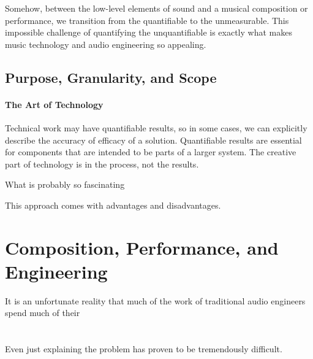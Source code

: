 Somehow, between the low-level elements of sound  and a musical
composition or performance, we transition from the quantifiable to the
unmeasurable. This impossible challenge of quantifying the
unquantifiable is exactly what makes music technology and audio
engineering so appealing.



\subsection{Purpose, Granularity, and Scope}
\label{sec:purp-gran-scope}



\paragraph{The Art of Technology} Technical work may have quantifiable
results, so in some cases, we can explicitly describe the accuracy of
efficacy of a solution. Quantifiable results are essential for
components that are intended to be parts of a larger system. The
creative part of technology is in the process, not the results.

What is probably so fascinating 

This approach comes with advantages and
disadvantages. 








\section{Composition, Performance, and Engineering}
It is an unfortunate reality that much of the work of traditional
audio engineers spend much of their

\section{}

\section{\polytempic}
Even just explaining the problem has proven to be tremendously
difficult. 

